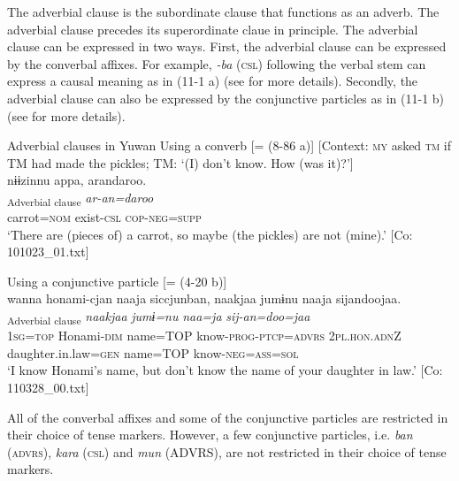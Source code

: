 The adverbial clause is the subordinate clause that functions as an adverb. The adverbial clause precedes its superordinate claue in principle. The adverbial clause can be expressed in two ways. First, the adverbial clause can be expressed by the converbal affixes. For example, \textit{{}-ba} (\textsc{csl}) following the verbal stem can express a causal meaning as in (11-1 a) (see  for more details). Secondly, the adverbial clause can also be expressed by the conjunctive particles as in (11-1 b) (see  for more details).

\ea\label{ex:11-1}  Adverbial clauses in Yuwan
  \ea Using a converb [= (8-86 a)] [Context: \textsc{my} asked \textsc{tm} if TM had made the pickles; TM: ‘(I) don’t know. How (was it)?’]\\
  \glll nɨɨzinnu  appa,  arandaroo.\\
    [\textit{nɨɨzin=nu}  \textit{ar-\Highlight{ba}}]\textsubscript{Adverbial clause}  \textit{ar-an=daroo}\\
    carrot=\textsc{nom}  exist-\textsc{csl}  \textsc{cop}-\textsc{neg}=\textsc{supp}\\
    \glt ‘There are (pieces of) a carrot, so maybe (the pickles) are not (mine).’ [Co: 101023\_01.txt]

  \ex Using a conjunctive particle [= (4-20 b)]\\
   \glll wanna  honami-{\textbar}cjan{\textbar}  naaja  siccjunban, naakjaa  jumɨnu  naaja  sijandoojaa.\\
    [\textit{wan=ja}  \textit{honami-cjan}  \textit{naa=ja}  \textit{sij-tur-n=\Highlight{ban}}]\textsubscript{Adverbial clause} \textit{naakjaa}  \textit{jumɨ=nu}  \textit{naa=ja}  \textit{sij-an=doo=jaa}\\
    1\textsc{sg}=\textsc{top}  Honami-\textsc{dim}  name=TOP  know-\textsc{prog}-\textsc{ptcp}=\textsc{advrs} 2\textsc{pl}.\textsc{hon}.\textsc{adn}Z  daughter.in.law=\textsc{gen}  name=TOP  know-\textsc{neg}=\textsc{ass}=\textsc{sol}\\
    \glt ‘I know Honami’s name, but don’t know the name of your daughter in law.’ [Co: 110328\_00.txt]
\z
\z

All of the converbal affixes and some of the conjunctive particles are restricted in their choice of tense markers. However, a few conjunctive particles, i.e. \textit{ban} (\textsc{advrs}), \textit{kara} (\textsc{csl}) and \textit{mun} (ADVRS), are not restricted in their choice of tense markers.

